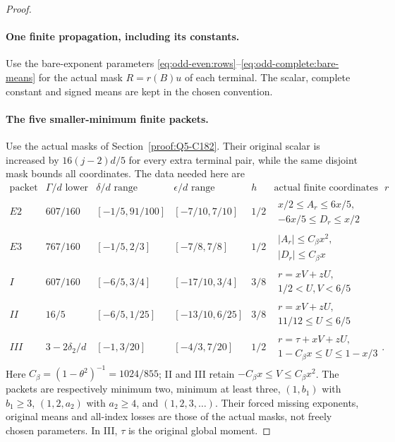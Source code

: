\begin{proof}
\paragraph{One finite propagation, including its constants.}
Use the bare-exponent parameters
\eqref{eq:odd-even:rows}--\eqref{eq:odd-complete:bare-means}
for the actual mask $R=r(B)u$ of each terminal. The scalar,
complete constant and signed means are kept in the chosen convention.

\paragraph{The five smaller-minimum finite packets.}
Use the actual masks of Section~\ref{proof:Q5-C182}.
Their original scalar is increased by $16(j-2)d/5$ for every extra
terminal pair, while the same disjoint mask bounds all coordinates.
The data needed here are
\[
\begin{array}{c|c|c|c|c|c}
 \text{packet}&\Gamma/d\text{ lower}&\delta/d\text{ range}
       &\epsilon/d\text{ range}&h&\text{actual finite coordinates of }r\\\hline
 E2&607/160&[-1/5,91/100]&[-7/10,7/10]&1/2
       &\begin{gathered}x/2\le A_r\le6x/5,\\-6x/5\le D_r\le x/2\end{gathered}\\
 E3&767/160&[-1/5,2/3]&[-7/8,7/8]&1/2
       &\begin{gathered}|A_r|\le C_\beta x^2,\\|D_r|\le C_\beta x\end{gathered}\\
 I&607/160&[-6/5,3/4]&[-17/10,3/4]&3/8
       &\begin{gathered}r=xV+zU,\\1/2<U,V<6/5\end{gathered}\\
 II&16/5&[-6/5,1/25]&[-13/10,6/25]&3/8
       &\begin{gathered}r=xV+zU,\\11/12\le U\le6/5\end{gathered}\\
 III&3-2\delta_2/d&[-1,3/20]&[-4/3,7/20]&1/2
       &\begin{gathered}r=\tau+xV+zU,\\1-C_\beta x\le U\le1-x/3\end{gathered}.
\end{array}
\]
Here $C_\beta=(1-\theta^2)^{-1}=1024/855$;
II and III retain $-C_\beta x\le V\le C_\beta x^2$.
The packets are respectively minimum two, minimum at least three,
$(1,b_1)$ with $b_1\ge3$, $(1,2,a_2)$ with $a_2\ge4$, and
$(1,2,3,\ldots)$. Their forced missing exponents, original means
and all-index losses are those of the actual masks, not freely
chosen parameters. In III, $\tau$ is the original global moment.


\end{proof}
